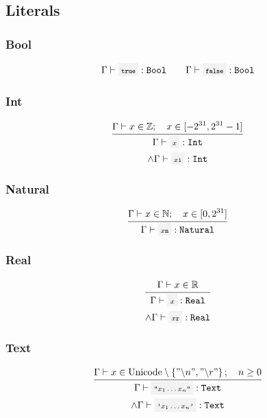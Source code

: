 \subsection{Literals}

\subsubsection{Bool}

\[
	\EnvSym\then \code{true}:\Bool \qquad \EnvSym \then \code{false}:\Bool
\]

\subsubsection{Int}

\[
	\infrule{
		\EnvSym\then x \in \mathbb{Z} \semiq x \in [-2^{31}, 2^{31} - 1]
	}{
		\EnvSym\then \code{$x$} : \Int \\*
		\land \EnvSym\then \code{$x$i} : \Int
	}
\]


\subsubsection{Natural}

\[
	\infrule{
		\EnvSym\then x \in \mathbb{N} \semiq x \in [0, 2^{31}]
	}{
		\EnvSym\then \code{$x$n} : \Natural
	}
\]


\subsubsection{Real}

\[
	\infrule{
		\EnvSym\then x \in \mathbb{R}
	}{
		\EnvSym\then \code{$x$} : \Real \\*
		\land \EnvSym\then \code{$x$r} : \Real
	}
\]


\subsubsection{Text}

\[
	\infrule{
		\EnvSym\then x \in \text{Unicode} \setminus \set{"\backslash n", "\backslash r"} \semiq n \geq 0
	}{
		\EnvSym\then \code{"$x_1 \dotsc x_n$"} : \Text \\*
		\land \EnvSym\then \code{'$x_1 \dotsc x_n$'} : \Text
	}
\]

